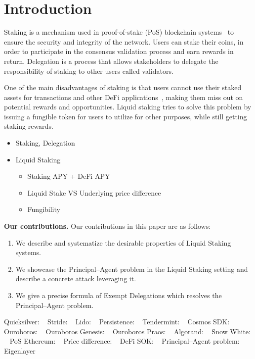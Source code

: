 \section{Introduction}

Staking is a mechanism used in proof-of-stake (PoS) blockchain
systems~\cite{2018tendermint, buchman2016tendermint,
ouroboros, algorand, casper} to ensure the security and
integrity of the network.
Users can stake their coins, in order to
participate in the consensus validation process and earn
rewards in return.
Delegation is a process that allows
stakeholders to delegate the responsibility of staking to
other users called validators.

One of the main disadvantages of staking is that
users cannot use their staked assets for transactions
and other DeFi applications~\cite{defi-sok}, making them miss
out on potential rewards and opportunities.
Liquid staking tries to solve this problem by issuing
a fungible token for users to utilize for other purposes,
while still getting staking rewards.

\begin{itemize}
    \item Staking, Delegation
    \item Liquid Staking
        \begin{itemize}
            \item Staking APY + DeFi APY
            \item Liquid Stake VS Underlying price difference 
            \item Fungibility
        \end{itemize}
\end{itemize}

\noindent
\textbf{Our contributions.} Our contributions in this paper are as follows:
\begin{enumerate}
    \item We describe and systematize the desirable properties of Liquid Staking systems.
    \item We showcase the Principal--Agent problem in the Liquid Staking setting and describe a concrete attack leveraging it.
    \item We give a precise formula of Exempt Delegations which resolves the Principal--Agent problem.
\end{enumerate}

Quicksilver: ~\cite{quicksilver}
Stride: ~\cite{stride}
Lido: ~\cite{lido}
Persistence: ~\cite{persistence}
Tendermint: ~\cite{2018tendermint, buchman2016tendermint}
Cosmos SDK: ~\cite{cosmossdk}
Ouroboros: ~\cite{ouroboros}
Ouroboros Genesis: ~\cite{ouroboros-genesis}
Ouroboros Praos: ~\cite{praos}
Algorand: ~\cite{algorand}
Snow White: ~\cite{DBLP:journals/iacr/BentovPS16a}
PoS Ethereum: ~\cite{casper,buterin2020combining,sompolinsky2015secure,kiayias2017trees}
Price difference: ~\cite{scharnowski2022liquid}
DeFi SOK: ~\cite{defi-sok}
Principal--Agent problem: ~\cite{jensen1976,wealthofnations}
Eigenlayer~\cite{eigenlayer}